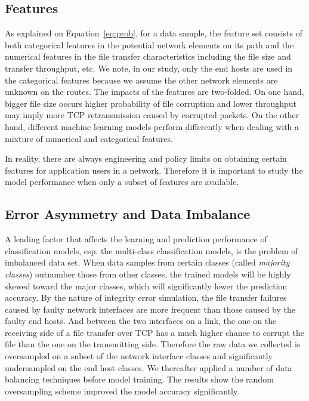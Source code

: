 \subsection{Features}
As explained on Equation~\ref{eq:prob}, for a data sample, the feature set consists of both categorical features in the potential network elements on its path and the numerical features 
in the file transfer characteristics including the file size and transfer throughput, etc. We note, in our study, only the end hosts are used in the categorical features because we assume the other network elements 
are unknown on the routes. The impacts of the features are two-folded. On one hand, bigger file size occurs higher probability of file corruption and lower throughput may imply more TCP retransmission caused by corrupted packets.
On the other hand, different machine learning models perform differently when dealing with a mixture of numerical and categorical features.   

In reality, there are always engineering and policy limits on obtaining certain features for application users in a network. Therefore it is important to study the model performance when only a subset of features are available.   

\subsection{Error Asymmetry and Data Imbalance} 
\label{sub:ml:imbalance}
A leading factor that affects the learning and prediction performance of classification models, esp. the multi-class classification models, is the problem of imbalanced data set. When data samples from certain classes (called {\it majority classes}) outnumber those from other classes, the trained models will be highly skewed toward the major classes, which will significantly lower the prediction accuracy. By the nature of integrity error simulation, the file transfer failures caused by faulty network interfaces are more frequent than those caused by the faulty end hosts. And between the two interfaces on a link, the one on the receiving side of a file transfer over TCP has a much higher chance to corrupt the file than the one on the transmitting side. Therefore the raw data we collected is oversampled on a subset of the network interface classes and significantly undersampled on the end host classes. We thereafter applied a number of data balancing techniques before model training. The results show the random oversampling scheme improved the model accuracy significantly.